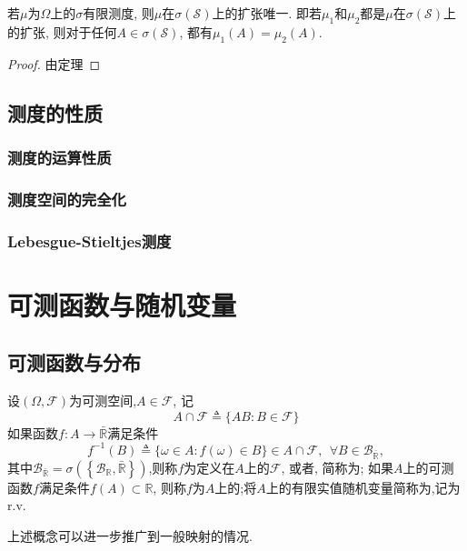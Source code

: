 \begin{theorem}[测度扩张定理]
	若$\mu$为$\Omega$上的$\sigma$有限测度, 则$\mu$在$\sigma(\mathscr{S})$上的扩张唯一. 即若$\mu_1$和$\mu_2$都是$\mu$在$\sigma(\mathscr{S})$上的扩张,
	则对于任何$A\in\sigma(\mathscr{S})$, 都有$\mu_1(A) = \mu_2(A)$.
\end{theorem}
\begin{proof}
	由定理
\end{proof}


\section{测度的性质}
\subsection{测度的运算性质}
\subsection{测度空间的完全化}
\subsection{Lebesgue-Stieltjes测度}



\chapter{可测函数与随机变量}
\section{可测函数与分布}


\begin{definition}
	设$(\Omega,\mathscr{F})$为可测空间,$A\in\mathscr{F}$, 记\begin{equation}
	A\cap \mathscr{F}\triangleq \{ AB:B\in\mathscr{F} \}
	\end{equation}
	如果函数$f:A\to\bar{\mathbb{R}}$满足条件\begin{equation}
	f^{-1}(B) \triangleq \{\omega\in A:f(\omega)\in B\}\in A\cap\mathscr{F},~~\forall B\in\mathscr{B}_{\bar{\mathbb{R}}},
	\end{equation}
	其中$\mathscr{B}_{\bar{\mathbb{R}}} = \sigma\left(\left\{\mathscr{B}_{\mathbb{R}},\bar{\mathbb{R}}\right\}\right)$,则称$f$为定义在$A$上的$\mathscr{F}$, 或者, 简称为; 如果$A$上的可测函数$f$满足条件$f(A)\subset \mathbb{R}$, 则称$f$为$A$上的;将$A$上的有限实值随机变量简称为,记为r.v.
\end{definition}
上述概念可以进一步推广到一般映射的情况.

